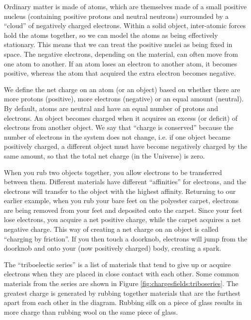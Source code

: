 Ordinary matter is made of atoms, which are themselves made of a small positive nucleus (containing positive protons and neutral neutrons) surrounded by a ``cloud'' of negatively charged electrons. Within a solid object, inter-atomic forces hold the atoms together, so we can model the atoms as being effectively stationary. This means that we can treat the positive nuclei as being fixed in space. The negative electrons, depending on the material, can often move from one atom to another. If an atom loses an electron to another atom, it becomes positive, whereas the atom that acquired the extra electron becomes negative.

We define the net charge on an atom (or an object) based on whether there are more protons (positive), more electrons (negative) or an equal amount (neutral). By default, atoms are neutral and have an equal number of protons and electrons. An object becomes charged when it acquires an excess (or deficit) of electrons from another object. We say that ``charge is conserved'' because the number of electrons in the system does not change, i.e. if one object became positively charged, a different object must have become negatively charged by the same amount, so that the total net charge (in the Universe) is zero.

When you rub two objects together, you allow electrons to be transferred between them. Different materials have different ``affinities'' for electrons, and the electrons will transfer to the object with the highest affinity. Returning to our earlier example, when you rub your bare feet on the polyester carpet, electrons are being removed from your feet and deposited onto the carpet. Since your feet lose electrons, you acquire a net positive charge, while the carpet acquires a net negative charge. This way of creating a net charge on an object is called ``charging by friction''. If you then touch a doorknob, electrons will jump from the doorknob and onto your (now positively charged) body, creating a spark.


The ``triboelectic series'' is a list of materials that tend to give up or acquire electrons when they are placed in close contact with each other. Some common materials from the series are shown in Figure \ref{fig:chargesfields:triboseries}.  The greatest charge is generated by rubbing together materials that are the furthest apart from each other in the diagram. Rubbing silk on a piece of glass results in more charge than rubbing wool on the same piece of glass. 



